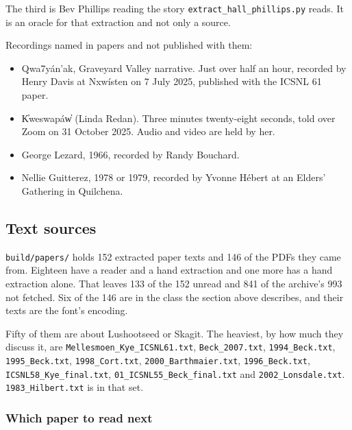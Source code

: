 The third is Bev Phillips reading the story \texttt{extract\_\allowbreak{}hall\_\allowbreak{}phillips.\allowbreak{}py} reads. It is an oracle for that extraction and not only a source.

Recordings named in papers and not published with them:

\begin{itemize}
\item Qwa7yán'ak, Graveyard Valley narrative. Just over half an hour, recorded by Henry Davis at Nxwísten on 7 July 2025, published with the ICSNL 61 paper.
\item K̓weswapáw̓ (Linda Redan). Three minutes twenty-eight seconds, told over Zoom on 31 October 2025. Audio and video are held by her.
\item George Lezard, 1966, recorded by Randy Bouchard.
\item Nellie Guitterez, 1978 or 1979, recorded by Yvonne Hébert at an Elders' Gathering in Quilchena.
\end{itemize}

\subsection{Text sources}

\texttt{build/\allowbreak{}papers/\allowbreak{}} holds 152 extracted paper texts and 146 of the PDFs they came from. Eighteen have a reader and a hand extraction and one more has a hand extraction alone. That leaves 133 of the 152 unread and 841 of the archive's 993 not fetched. Six of the 146 are in the class the section above describes, and their texts are the font's encoding.

Fifty of them are about Lushootseed or Skagit. The heaviest, by how much they discuss it, are \texttt{Mellesmoen\_\allowbreak{}Kye\_\allowbreak{}ICSNL61.\allowbreak{}txt}, \texttt{Beck\_\allowbreak{}2007.\allowbreak{}txt}, \texttt{1994\_\allowbreak{}Beck.\allowbreak{}txt}, \texttt{1995\_\allowbreak{}Beck.\allowbreak{}txt}, \texttt{1998\_\allowbreak{}Cort.\allowbreak{}txt}, \texttt{2000\_\allowbreak{}Barthmaier.\allowbreak{}txt}, \texttt{1996\_\allowbreak{}Beck.\allowbreak{}txt}, \texttt{ICSNL58\_\allowbreak{}Kye\_\allowbreak{}final.\allowbreak{}txt}, \texttt{01\_\allowbreak{}ICSNL55\_\allowbreak{}Beck\_\allowbreak{}final.\allowbreak{}txt} and \texttt{2002\_\allowbreak{}Lonsdale.\allowbreak{}txt}. \texttt{1983\_\allowbreak{}Hilbert.\allowbreak{}txt} is in that set.

\subsubsection{Which paper to read next}

